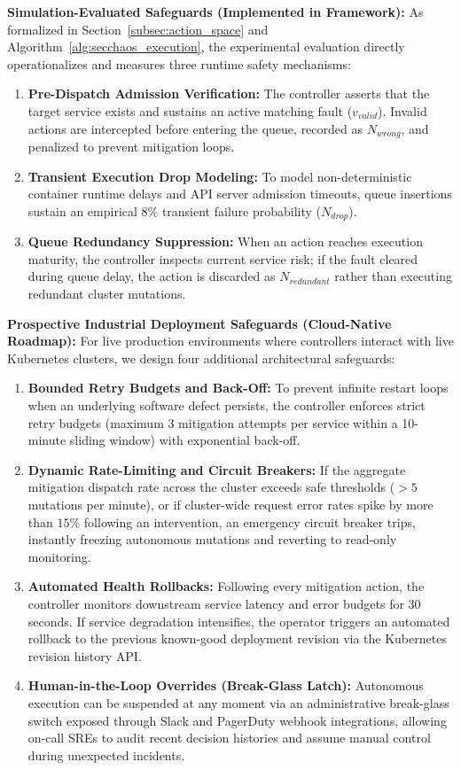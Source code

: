\documentclass[11pt,a4paper]{article}
\begin{document}
\textbf{Simulation-Evaluated Safeguards (Implemented in Framework):} As formalized in Section~\ref{subsec:action_space} and Algorithm~\ref{alg:secchaos_execution}, the experimental evaluation directly operationalizes and measures three runtime safety mechanisms:
\begin{enumerate}
    \item \textbf{Pre-Dispatch Admission Verification:} The controller asserts that the target service exists and sustains an active matching fault ($v_{valid}$). Invalid actions are intercepted before entering the queue, recorded as $N_{wrong}$, and penalized to prevent mitigation loops.
    \item \textbf{Transient Execution Drop Modeling:} To model non-deterministic container runtime delays and API server admission timeouts, queue insertions sustain an empirical $8\%$ transient failure probability ($N_{drop}$).
    \item \textbf{Queue Redundancy Suppression:} When an action reaches execution maturity, the controller inspects current service risk; if the fault cleared during queue delay, the action is discarded as $N_{redundant}$ rather than executing redundant cluster mutations.
\end{enumerate}

\textbf{Prospective Industrial Deployment Safeguards (Cloud-Native Roadmap):} For live production environments where controllers interact with live Kubernetes clusters, we design four additional architectural safeguards:
\begin{enumerate}
    \item \textbf{Bounded Retry Budgets and Back-Off:} To prevent infinite restart loops when an underlying software defect persists, the controller enforces strict retry budgets (maximum 3 mitigation attempts per service within a 10-minute sliding window) with exponential back-off.
    \item \textbf{Dynamic Rate-Limiting and Circuit Breakers:} If the aggregate mitigation dispatch rate across the cluster exceeds safe thresholds ($> 5$ mutations per minute), or if cluster-wide request error rates spike by more than $15\%$ following an intervention, an emergency circuit breaker trips, instantly freezing autonomous mutations and reverting to read-only monitoring.
    \item \textbf{Automated Health Rollbacks:} Following every mitigation action, the controller monitors downstream service latency and error budgets for 30 seconds. If service degradation intensifies, the operator triggers an automated rollback to the previous known-good deployment revision via the Kubernetes revision history API.
    \item \textbf{Human-in-the-Loop Overrides (Break-Glass Latch):} Autonomous execution can be suspended at any moment via an administrative break-glass switch exposed through Slack and PagerDuty webhook integrations, allowing on-call SREs to audit recent decision histories and assume manual control during unexpected incidents.
\end{enumerate}
\end{document}
